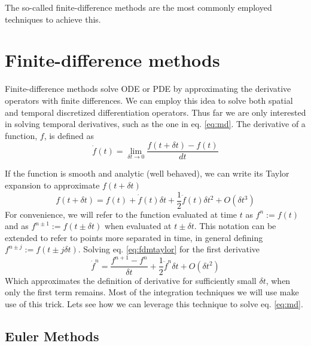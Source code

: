 \documentclass[ twoside,openright,titlepage,numbers=noenddot,%
headinclude,footinclude,cleardoublepage=empty,abstract=on,
BCOR=5mm,paper=a4,fontsize=11pt, dvipsnames
]{scrreprt}
\newcommand{\dt}{\delta t}
\newcommand{\half}{\frac{1}{2}}
\begin{document}
The so-called finite-difference methods are the most commonly employed techniques to achieve this.
\section{Finite-difference methods}
Finite-difference methods\cite{Grossmann2007} solve \gls{ODE} or \gls{PDE} by approximating the derivative operators with finite differences.
We can employ this idea to solve both spatial and temporal discretized differentiation operators. Thus far we are only interested in solving temporal derivatives, such as the one in eq. \eqref{eq:md}.
The derivative of a function, $f$, is defined as
\begin{equation}
  \dot{f}(t) = \lim_{\dt\rightarrow 0} \frac{f(t+\dt) - f(t)}{dt}
\end{equation}

If the function is smooth and analytic (well behaved), we can write its Taylor expansion to approximate $f(t+\dt)$
\begin{equation}
  \label{eq:fdmtaylor}
  f(t+\dt) = f(t)+\dot{f}(t)\dt + \half\ddot{f}(t)\dt^2 + O(\dt^3)
\end{equation}
For convenience, we will refer to the function evaluated at time $t$ as $f^n := f(t)$ and as $f^{n\pm 1} := f(t\pm \dt)$ when evaluated at $t\pm \dt$. This notation can be extended to refer to points more separated in time, in general defining $f^{n\pm j} := f(t\pm j\dt)$.
Solving eq. \eqref{eq:fdmtaylor} for the first derivative
\begin{equation}
 \dot{f}^n  =  \frac{f^{n+1} - f^n}{\dt} + \half\ddot{f}^n\dt + O(\dt^2)
\end{equation}
Which approximates the definition of derivative for sufficiently small $\dt$, when only the first term remains.
Most of the integration techniques we will use make use of this trick.
Lets see how we can leverage this technique to solve eq. \eqref{eq:md}.
\subsection{Euler Methods}\label{sec:euler}
\end{document}
